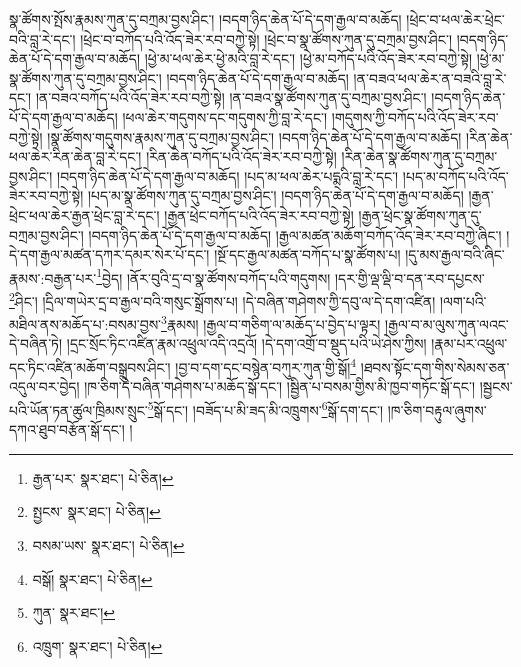 སྣ་ཚོགས་སྤོས་རྣམས་ཀུན་དུ་བཀྲམ་བྱས་ཤིང་། །བདག་ཉིད་ཆེན་པོ་དེ་དག་རྒྱལ་བ་མཆོད། །ཕྲེང་བ་ཕལ་ཆེར་ཕྲེང་བའི་བླ་རེ་དང་། །ཕྲེང་བ་བཀོད་པའི་འོད་ཟེར་རབ་བཀྱེ་སྟེ། །ཕྲེང་བ་སྣ་ཚོགས་ཀུན་དུ་བཀྲམ་བྱས་ཤིང་། །བདག་ཉིད་ཆེན་པོ་དེ་དག་རྒྱལ་བ་མཆོད། །ཕྱེ་མ་ཕལ་ཆེར་ཕྱེ་མའི་བླ་རེ་དང་། །ཕྱེ་མ་བཀོད་པའི་འོད་ཟེར་རབ་བཀྱེ་སྟེ། །ཕྱེ་མ་སྣ་ཚོགས་ཀུན་དུ་བཀྲམ་བྱས་ཤིང་། །བདག་ཉིད་ཆེན་པོ་དེ་དག་རྒྱལ་བ་མཆོད། །ན་བཟའ་ཕལ་ཆེར་ན་བཟའི་བླ་རེ་དང་། །ན་བཟའ་བཀོད་པའི་འོད་ཟེར་རབ་བཀྱེ་སྟེ། །ན་བཟའ་སྣ་ཚོགས་ཀུན་དུ་བཀྲམ་བྱས་ཤིང་། །བདག་ཉིད་ཆེན་པོ་དེ་དག་རྒྱལ་བ་མཆོད། །ཕལ་ཆེར་གདུགས་དང་གདུགས་ཀྱི་བླ་རེ་དང་། །གདུགས་ཀྱི་བཀོད་པའི་འོད་ཟེར་རབ་བཀྱེ་སྟེ། །སྣ་ཚོགས་གདུགས་རྣམས་ཀུན་དུ་བཀྲམ་བྱས་ཤིང་། །བདག་ཉིད་ཆེན་པོ་དེ་དག་རྒྱལ་བ་མཆོད། །རིན་ཆེན་ཕལ་ཆེར་རིན་ཆེན་བླ་རེ་དང་། །རིན་ཆེན་བཀོད་པའི་འོད་ཟེར་རབ་བཀྱེ་སྟེ། །རིན་ཆེན་སྣ་ཚོགས་ཀུན་དུ་བཀྲམ་བྱས་ཤིང་། །བདག་ཉིད་ཆེན་པོ་དེ་དག་རྒྱལ་བ་མཆོད། །པད་མ་ཕལ་ཆེར་པདྨའི་བླ་རེ་དང་། །པད་མ་བཀོད་པའི་འོད་ཟེར་རབ་བཀྱེ་སྟེ། །པད་མ་སྣ་ཚོགས་ཀུན་དུ་བཀྲམ་བྱས་ཤིང་། །བདག་ཉིད་ཆེན་པོ་དེ་དག་རྒྱལ་བ་མཆོད། །རྒྱན་ཕྲེང་ཕལ་ཆེར་རྒྱན་ཕྲེང་བླ་རེ་དང་། །རྒྱན་ཕྲེང་བཀོད་པའི་འོད་ཟེར་རབ་བཀྱེ་སྟེ། །རྒྱན་ཕྲེང་སྣ་ཚོགས་ཀུན་དུ་བཀྲམ་བྱས་ཤིང་། །བདག་ཉིད་ཆེན་པོ་དེ་དག་རྒྱལ་བ་མཆོད། །རྒྱལ་མཚན་མཆོག་བཀོད་འོད་ཟེར་རབ་བཀྱེ་ཞིང་། །དེ་དག་རྒྱལ་མཚན་དཀར་དམར་སེར་པོ་དང་། །སྔོ་དང་རྒྱལ་མཚན་བཀོད་པ་སྣ་ཚོགས་པ། །དུ་མས་རྒྱལ་བའི་ཞིང་རྣམས་:བརྒྱན་པར་\footnote{རྒྱན་པར་  སྣར་ཐང་།  པེ་ཅིན། }བྱེད། །ནོར་བུའི་དྲ་བ་སྣ་ཚོགས་བཀོད་པའི་གདུགས། །དར་གྱི་ལྡ་ལྡི་བ་དན་རབ་དཔྱངས་\footnote{སྤྱངས་  སྣར་ཐང་།  པེ་ཅིན། }ཤིང་། །དྲིལ་གཡེར་དྲ་བ་རྒྱལ་བའི་གསུང་སྒྲོགས་པ། །དེ་བཞིན་གཤེགས་ཀྱི་དབུ་ལ་དེ་དག་འཛིན། །ལག་པའི་མཐིལ་ནས་མཆོད་པ་:བསམ་བྱས་\footnote{བསམ་ཡས་  སྣར་ཐང་།  པེ་ཅིན། }རྣམས། །རྒྱལ་བ་གཅིག་ལ་མཆོད་པ་བྱེད་པ་ལྟར། །རྒྱལ་བ་མ་ལུས་ཀུན་ལའང་དེ་བཞིན་ཏེ། །དྲང་སྲོང་ཏིང་འཛིན་རྣམ་འཕྲུལ་འདི་འདྲའོ། །དེ་དག་འགྲོ་བ་སྡུད་པའི་ཡེ་ཤེས་ཀྱིས། །རྣམ་པར་འཕྲུལ་དང་ཏིང་འཛིན་མཆོག་བསྒྲུབས་ཤིང་། །བྱ་བ་དག་དང་བསྙེན་བཀུར་ཀུན་གྱི་སྒོ།\footnote{བསྒོ།  སྣར་ཐང་།  པེ་ཅིན། } །ཐབས་སྟོང་དག་གིས་སེམས་ཅན་འདུལ་བར་བྱེད། །ཁ་ཅིག་དེ་བཞིན་གཤེགས་པ་མཆོད་སྒོ་དང་། །སྦྱིན་པ་བསམ་གྱིས་མི་ཁྱབ་གཏོང་སྒོ་དང་། །སྦྱངས་པའི་ཡོན་ཏན་ཚུལ་ཁྲིམས་སྲུང་\footnote{ཀུན་  སྣར་ཐང་། }སྒོ་དང་། །བཟོད་པ་མི་ཟད་མི་འཁྲུགས་\footnote{འཁྲུག་  སྣར་ཐང་།  པེ་ཅིན། }སྒོ་དག་དང་། །ཁ་ཅིག་བརྟུལ་ཞུགས་དཀའ་ཐུབ་བརྩོན་སྒོ་དང་། །
